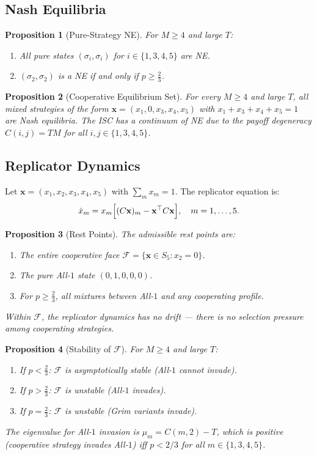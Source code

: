 \documentclass[12pt,a4paper]{article}
\newtheorem{proposition}{Proposition}[section]
\begin{document}
\subsection{Nash Equilibria}

\begin{proposition}[Pure-Strategy NE]\label{prop:v3_pureNE}
For $M\geq 4$ and large $T$:
\begin{enumerate}
  \item All pure states $(\sigma_i,\sigma_i)$ for $i\in\{1,3,4,5\}$ are NE.
  \item $(\sigma_2,\sigma_2)$ is a NE if and only if $p\geq\tfrac{2}{3}$.
\end{enumerate}
\end{proposition}

\begin{proposition}[Cooperative Equilibrium Set]\label{prop:v3_coopset}
For every $M\geq 4$ and large $T$, all mixed strategies of the form
$\mathbf{x}=(x_1,0,x_3,x_4,x_5)$ with $x_1+x_3+x_4+x_5=1$ are Nash equilibria.
The ISC has a \emph{continuum} of NE due to the payoff degeneracy $C(i,j)=TM$
for all $i,j\in\{1,3,4,5\}$.
\end{proposition}

\subsection{Replicator Dynamics}

Let $\mathbf{x}=(x_1,x_2,x_3,x_4,x_5)$ with $\sum_m x_m=1$. The replicator equation is:
\[
  \dot{x}_m = x_m\Bigl[(C\mathbf{x})_m - \mathbf{x}^\top C\mathbf{x}\Bigr],
  \quad m=1,\ldots,5.
\]

\begin{proposition}[Rest Points]
The admissible rest points are:
\begin{enumerate}
  \item The entire cooperative face $\mathcal{F} = \{\mathbf{x}\in S_5 : x_2=0\}$.
  \item The pure All-$1$ state $(0,1,0,0,0)$.
  \item For $p\geq\tfrac{2}{3}$, all mixtures between All-$1$ and any
        cooperating profile.
\end{enumerate}
Within $\mathcal{F}$, the replicator dynamics has \emph{no drift} --- there is
no selection pressure among cooperating strategies.
\end{proposition}

\begin{proposition}[Stability of $\mathcal{F}$]
For $M\geq 4$ and large $T$:
\begin{enumerate}
  \item If $p<\tfrac{2}{3}$: $\mathcal{F}$ is asymptotically stable
        (All-$1$ cannot invade).
  \item If $p>\tfrac{2}{3}$: $\mathcal{F}$ is unstable (All-$1$ invades).
  \item If $p=\tfrac{2}{3}$: $\mathcal{F}$ is unstable (Grim variants invade).
\end{enumerate}
The eigenvalue for All-$1$ invasion is $\mu_m = C(m,2) - T$, which is positive
(cooperative strategy invades All-$1$) iff $p<2/3$ for all $m\in\{1,3,4,5\}$.
\end{proposition}
\end{document}
